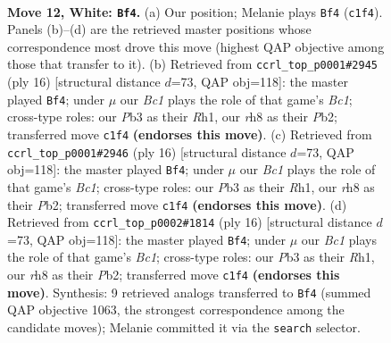 \documentclass[11pt]{article}
\begin{document}
\clearpage

\begin{figure}[p]\centering
\begin{subfigure}{0.46\textwidth}\centering
\resizebox{\linewidth}{!}{%
\newchessgame
\chessboard[
  setfen={r1bqk2r/1p3p2/4pnp1/p1b4p/7P/1P1B1NP1/P1P2P2/R1BQK2R w KQkq - 0 12},
  showmover=false,
  pgfstyle=straightmove, color=movearrow, markmove={c1-f4}
]}
\caption{}
\end{subfigure}\hfill
\begin{subfigure}{0.46\textwidth}\centering
\resizebox{\linewidth}{!}{%
\newchessgame
\chessboard[
  setfen={r1bqk2r/pp3ppp/4pn2/2b5/8/3B1N2/PPP2PPP/R1BQK2R w KQkq - 0 9},
  showmover=false,
  pgfstyle=straightmove, color=movearrow, markmove={c1-f4}
]}
\caption{}
\end{subfigure}
\\[4pt]
\begin{subfigure}{0.46\textwidth}\centering
\resizebox{\linewidth}{!}{%
\newchessgame
\chessboard[
  setfen={r1bqk2r/pp3ppp/4pn2/2b5/8/3B1N2/PPP2PPP/R1BQK2R w KQkq - 0 9},
  showmover=false,
  pgfstyle=straightmove, color=movearrow, markmove={c1-f4}
]}
\caption{}
\end{subfigure}\hfill
\begin{subfigure}{0.46\textwidth}\centering
\resizebox{\linewidth}{!}{%
\newchessgame
\chessboard[
  setfen={r1bqk2r/pp3ppp/4pn2/2b5/8/3B1N2/PPP2PPP/R1BQK2R w KQkq - 0 9},
  showmover=false,
  pgfstyle=straightmove, color=movearrow, markmove={c1-f4}
]}
\caption{}
\end{subfigure}
\caption{\textbf{Move 12, White: \texttt{Bf4}.} (a) Our position; Melanie plays \texttt{Bf4} (\texttt{c1f4}). Panels (b)--(d) are the retrieved master positions whose correspondence most drove this move (highest QAP objective among those that transfer to it). (b) Retrieved from \texttt{ccrl\_top\_p0001\#2945} (ply 16) [structural distance $d$=73, QAP obj=118]: the master played \texttt{Bf4}; under $\mu$ our \emph{Bc1} plays the role of that game's \emph{Bc1}; cross-type roles: our \emph{P}b3 as their \emph{R}h1, our \emph{r}h8 as their \emph{P}b2; transferred move \texttt{c1f4} \textbf{(endorses this move)}. (c) Retrieved from \texttt{ccrl\_top\_p0001\#2946} (ply 16) [structural distance $d$=73, QAP obj=118]: the master played \texttt{Bf4}; under $\mu$ our \emph{Bc1} plays the role of that game's \emph{Bc1}; cross-type roles: our \emph{P}b3 as their \emph{R}h1, our \emph{r}h8 as their \emph{P}b2; transferred move \texttt{c1f4} \textbf{(endorses this move)}. (d) Retrieved from \texttt{ccrl\_top\_p0002\#1814} (ply 16) [structural distance $d$=73, QAP obj=118]: the master played \texttt{Bf4}; under $\mu$ our \emph{Bc1} plays the role of that game's \emph{Bc1}; cross-type roles: our \emph{P}b3 as their \emph{R}h1, our \emph{r}h8 as their \emph{P}b2; transferred move \texttt{c1f4} \textbf{(endorses this move)}. Synthesis: 9 retrieved analogs transferred to \texttt{Bf4} (summed QAP objective 1063, the strongest correspondence among the candidate moves); Melanie committed it via the \texttt{search} selector.}
\label{fig:thought-m22}
\end{figure}
\end{document}
